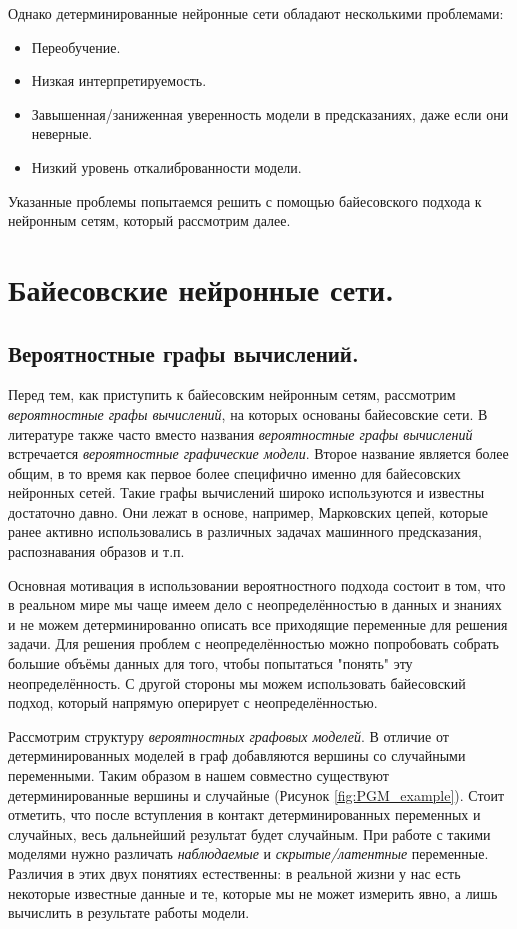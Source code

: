 Однако детерминированные нейронные сети обладают несколькими проблемами:
\begin{itemize}
    \item Переобучение.
    \item Низкая интерпретируемость.
    \item Завышенная/заниженная уверенность модели в предсказаниях, даже если они неверные.
    \item Низкий уровень откалиброванности модели.
\end{itemize}

Указанные проблемы попытаемся решить с помощью байесовского подхода к нейронным сетям, который
 рассмотрим далее.

\section{Байесовские нейронные сети.}
\subsection{Вероятностные графы вычислений.}

Перед тем, как приступить к байесовским нейронным сетям, рассмотрим \textit{вероятностные графы вычислений}, на которых основаны
 байесовские сети. В литературе также часто вместо названия \textit{вероятностные графы вычислений} встречается \textit{вероятностные графические модели}.
 Второе название является более общим, в то время как первое более специфично именно для байесовских нейронных сетей.
 Такие графы вычислений широко используются и известны достаточно давно. Они лежат в основе, например,
 Марковских цепей, которые ранее активно использовались в различных задачах машинного предсказания, распознавания образов и т.п.

Основная мотивация в использовании вероятностного подхода состоит в том, что в реальном мире мы чаще имеем дело с неопределённостью в данных и знаниях
 и не можем детерминированно описать все приходящие переменные для решения задачи. Для решения проблем с неопределённостью
 можно попробовать собрать большие объёмы данных для того, чтобы попытаться "понять" эту неопределённость. С другой стороны
 мы можем использовать байесовский подход, который напрямую оперирует с неопределённостью.

Рассмотрим структуру \textit{вероятностных графовых моделей}. В отличие от детерминированных моделей в граф добавляются вершины
 со случайными переменными. Таким образом в нашем совместно существуют детерминированные вершины и случайные (Рисунок \ref{fig:PGM_example}). Стоит отметить,
 что после вступления в контакт детерминированных переменных и случайных, весь дальнейший результат будет случайным.
 При работе с такими моделями нужно различать \textit{наблюдаемые} и \textit{скрытые/латентные} переменные.
 Различия в этих двух понятиях естественны: в реальной жизни у нас есть некоторые известные данные и те, которые мы не может измерить явно,
 а лишь вычислить в результате работы модели.

